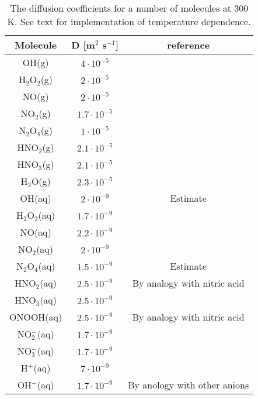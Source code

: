 \documentclass[12pt]{article}
\begin{document}
    \begin{table}[htpb] %
        \begin{center}
            \begin{tabular}{c |c |c}\rmfamily
                Molecule & D [m$^2$ s$^{-1}$]& reference\\ \hline \hline
                OH(g) & $4\cdot10^{-5}$ & \cite{Sakiyama2012b}\\
                H$_2$O$_2$(g) & $2\cdot10^{-5}$ & \cite{Sakiyama2012b}\\
                NO(g) & $2\cdot10^{-5}$ & \cite{Sakiyama2012b}\\
                NO$_2$(g) & $1.7\cdot10^{-5}$ & \cite{Sakiyama2012b}\\
                N$_2$O$_4$(g) & $1\cdot10^{-5}$ & \cite{Sakiyama2012b}\\
                HNO$_2$(g) & $2.1\cdot10^{-5}$ & \cite{Sakiyama2012b}\\
                HNO$_3$(g) & $2.1\cdot10^{-5}$ & \cite{Sakiyama2012b}\\
                H$_2$O(g) & $2.3\cdot10^{-5}$ & \cite{Sakiyama2012b}\\
                OH(aq) & $2\cdot10^{-9}$ & Estimate\\
                H$_2$O$_2$(aq) & $1.7\cdot10^{-9}$ & \cite{mcmurtrie1948measurement}\\
                NO(aq) & $2.2\cdot10^{-9}$ & \cite{zacharia2005diffusivity}\\
                NO$_2$(aq) & $2\cdot10^{-9}$ & \cite{skinn2013nitrogen}\\
                N$_2$O$_4$(aq) & $1.5\cdot10^{-9}$ & Estimate\\
                HNO$_2$(aq) & $2.5\cdot10^{-9}$ & By analogy with nitric acid\\
                HNO$_3$(aq) & $2.5\cdot10^{-9}$ & \cite{wills1971diffusion}\\
                ONOOH(aq) & $2.5\cdot10^{-9}$ & By analogy with nitric acid\\    
                NO$^{-}_2$(aq) & $1.7\cdot10^{-9}$ & \cite{kreft2001individual}\\
                NO$^{-}_3$(aq) & $1.7\cdot10^{-9}$ & \cite{kreft2001individual}\\
                H$^{+}$(aq) & $7\cdot10^{-9}$ & \cite{agmon1995grotthuss}\\
                OH$^{-}$(aq) & $1.7\cdot10^{-9}$ & By anology with other anions\\
            \end{tabular}
        \end{center}
        \caption{The diffusion coefficients for a number of molecules at 300 K. See text for implementation of temperature dependence.}
        \label{tab:diffusioncoef}    
    \end{table}
\end{document}
